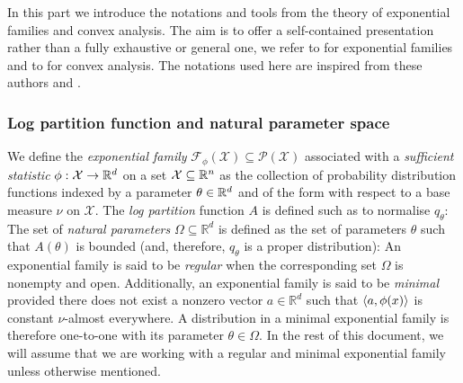 
In this part we introduce the notations and tools from the theory of exponential families and convex analysis. The aim is to offer a self-contained presentation rather than a fully exhaustive or general one, we refer to \citet{brown86} for exponential families and to \citet{rockafellar70} for convex analysis. The notations used here are inspired from these authors and \citet{wainwright08}.

\subsubsection*{Log partition function and natural parameter space
}

We define the \emph{exponential family} $\mathcal F_\phi(\mathcal X)\subseteq\mathcal P(\mathcal X)$ associated with a \emph{sufficient statistic} $\phi:\mathcal X\to\mathbb R^{d}$ on a set $\mathcal X\subseteq \mathbb R^{n}$ as the collection of probability distribution functions indexed by a parameter $\theta\in\mathbb R^{d}$ and of the form
%
%
with respect to a base measure $\nu$ on $\mathcal X$. The \emph{log partition} function $A$ is defined such as to normalise $q_{\theta}$:
%
%
The set of \emph{natural parameters} $\Omega \subseteq \mathbb R^{d}$ is defined as the set of parameters $\theta$ such that $A(\theta)$ is bounded (and, therefore, $q_\theta$ is a proper distribution):
%
An exponential family is said to be \emph{regular} when the corresponding set $\Omega$ is nonempty and open. Additionally, an exponential family is said to be \emph{minimal} provided there does not exist a nonzero vector $a\in\mathbb R^{d}$ such that $\left\langle a,\phi(x) \right\rangle$ is constant $\nu$-almost everywhere. A distribution in a minimal exponential family is therefore one-to-one with its parameter $\theta\in\Omega$. In the rest of this document, we will assume that we are working with a regular and minimal exponential family unless otherwise mentioned.

